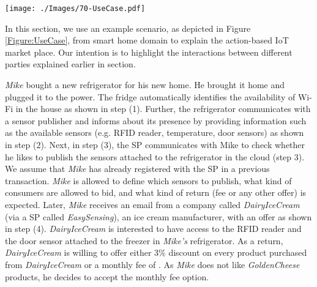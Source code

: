 \documentclass[conference]{IEEEtran}
\begin{document}
\begin{figure*}[t]
 \centering
\texttt{[image: ./Images/70-UseCase.pdf]}
\caption{A futuristic scenario that explains the interactions in sensing as a service model in trading-based environment. This is not a typical smart home scenario where refrigerator tells the users what is inside, what need to be shopped or what kind of recipes can be prepared for dinner.}
 \label{Figure:UseCase}	
\vspace{-0.60cm}	
\end{figure*}


In this section, we use an example scenario, as depicted in Figure \ref{Figure:UseCase}, from smart home domain to explain the action-based IoT market place. Our intention is to highlight the interactions between different parties explained earlier in section.


 
\textit{Mike} bought a new refrigerator for his new home. He brought it home and plugged it to the power. The fridge automatically identifies the availability of Wi-Fi in the house as shown in step (1). Further, the refrigerator communicates with a sensor publisher and informs about its presence by providing information such as the available sensors (e.g. RFID reader, temperature, door sensors) as shown in  step (2). 
Next, in step (3), the SP communicates with Mike to check whether he likes to publish the sensors attached to the refrigerator in the cloud (step 3). We assume that \textit{Mike} has already registered with the SP in a previous transaction. \textit{Mike} is allowed to define which sensors to publish, what kind of consumers are allowed to bid, and what kind of return (fee or any other offer) is expected. Later, \textit{Mike} receives an email from a company called \textit{DairyIceCream} (via a SP called \textit{EasySensing}), an ice cream manufacturer, with an offer as shown in  step (4). \textit{DairyIceCream} is interested to have access to the RFID reader and the door sensor attached to the freezer in  \textit{Mike's} refrigerator. As a return, \textit{DairyIceCream} is willing to offer either 3\% discount on every product purchased from \textit{DairyIceCream} or a monthly fee of \1. As \textit{Mike} does not like \textit{GoldenCheese} products, he decides to accept the monthly fee option. 
\end{document}
